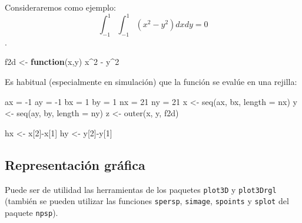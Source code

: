 \documentclass[
  10pt,
]{book}
\newenvironment{Shaded}{\begin{snugshade}}{\end{snugshade}}
\newcommand{\AttributeTok}[1]{\textcolor[rgb]{0.77,0.63,0.00}{#1}}
\newcommand{\ControlFlowTok}[1]{\textcolor[rgb]{0.13,0.29,0.53}{\textbf{#1}}}
\newcommand{\DecValTok}[1]{\textcolor[rgb]{0.00,0.00,0.81}{#1}}
\newcommand{\FunctionTok}[1]{\textcolor[rgb]{0.00,0.00,0.00}{#1}}
\newcommand{\NormalTok}[1]{#1}
\newcommand{\OtherTok}[1]{\textcolor[rgb]{0.56,0.35,0.01}{#1}}
\newcommand{\SpecialCharTok}[1]{\textcolor[rgb]{0.00,0.00,0.00}{#1}}
\theoremstyle{break}
\theoremstyle{nonumberplain}
\begin{document}
Consideraremos como ejemplo:
\[\int_{-1}^{1} \int_{-1}^{1} \left( x^2 - y^2 \right) dx dy = 0\].

\begin{Shaded}
\begin{Highlighting}[]
\NormalTok{f2d }\OtherTok{\textless{}{-}} \ControlFlowTok{function}\NormalTok{(x,y) x}\SpecialCharTok{\^{}}\DecValTok{2} \SpecialCharTok{{-}}\NormalTok{ y}\SpecialCharTok{\^{}}\DecValTok{2}
\end{Highlighting}
\end{Shaded}

Es habitual (especialmente en simulación) que la función se evalúe en una rejilla:

\begin{Shaded}
\begin{Highlighting}[]
\NormalTok{ax }\OtherTok{=} \SpecialCharTok{{-}}\DecValTok{1}
\NormalTok{ay }\OtherTok{=} \SpecialCharTok{{-}}\DecValTok{1}
\NormalTok{bx }\OtherTok{=} \DecValTok{1}
\NormalTok{by }\OtherTok{=} \DecValTok{1}
\NormalTok{nx }\OtherTok{=} \DecValTok{21}
\NormalTok{ny }\OtherTok{=} \DecValTok{21}
\NormalTok{x }\OtherTok{\textless{}{-}} \FunctionTok{seq}\NormalTok{(ax, bx, }\AttributeTok{length =}\NormalTok{ nx)}
\NormalTok{y }\OtherTok{\textless{}{-}} \FunctionTok{seq}\NormalTok{(ay, by, }\AttributeTok{length =}\NormalTok{ ny)}
\NormalTok{z }\OtherTok{\textless{}{-}} \FunctionTok{outer}\NormalTok{(x, y, f2d)}

\NormalTok{hx }\OtherTok{\textless{}{-}}\NormalTok{ x[}\DecValTok{2}\NormalTok{]}\SpecialCharTok{{-}}\NormalTok{x[}\DecValTok{1}\NormalTok{]}
\NormalTok{hy }\OtherTok{\textless{}{-}}\NormalTok{ y[}\DecValTok{2}\NormalTok{]}\SpecialCharTok{{-}}\NormalTok{y[}\DecValTok{1}\NormalTok{]}
\end{Highlighting}
\end{Shaded}

\hypertarget{representaciuxf3n-gruxe1fica}{%
\subsection{Representación gráfica}\label{representaciuxf3n-gruxe1fica}}

Puede ser de utilidad las herramientas de los paquetes \texttt{plot3D} y \texttt{plot3Drgl}
(también se pueden utilizar las funciones \texttt{spersp}, \texttt{simage}, \texttt{spoints} y \texttt{splot}
del paquete \texttt{npsp}).
\end{document}
